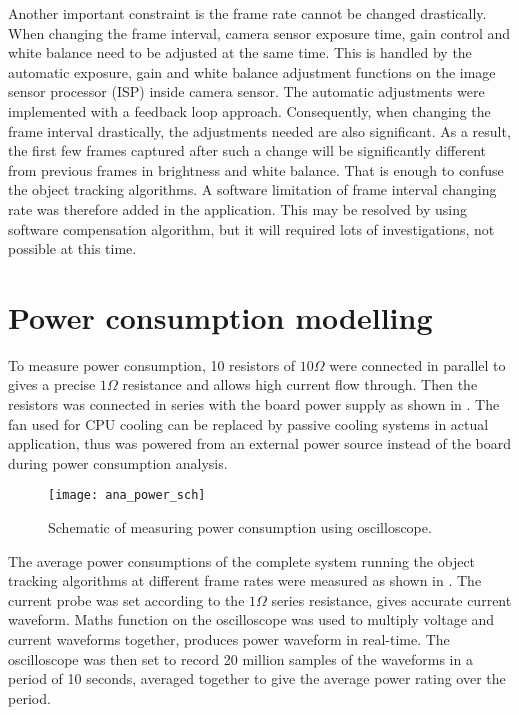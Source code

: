 Another important constraint is the frame rate cannot be changed drastically. When changing the frame interval, camera sensor exposure time, gain control and white balance need to be adjusted at the same time. This is handled by the automatic exposure, gain and white balance adjustment functions on the image sensor processor (ISP) inside camera sensor. The automatic adjustments were implemented with a feedback loop approach. Consequently, when changing the frame interval drastically, the adjustments needed are also significant. As a result, the first few frames captured after such a change will be significantly different from previous frames in brightness and white balance. That is enough to confuse the object tracking algorithms. A software limitation of frame interval changing rate was therefore added in the application. This may be resolved by using software compensation algorithm, but it will required lots of investigations, not possible at this time.



\section{}

\section{Power consumption modelling}

To measure power consumption, 10 resistors of $10 \Omega$ were connected in parallel to gives a precise $1 \Omega$ resistance and allows high current flow through. Then the resistors was connected in series with the board power supply as shown in . The fan used for CPU cooling can be replaced by passive cooling systems in actual application, thus was powered from an external power source instead of the board during power consumption analysis.

\begin{figure}[H]
  \centering
  \texttt{[image: ana\_power\_sch]}
  \caption{Schematic of measuring power consumption using oscilloscope.}
  \label{ana:power:sch}
\end{figure}

The average power consumptions of the complete system running the object tracking algorithms at different frame rates were measured as shown in . The current probe was set according to the $1 \Omega$ series resistance, gives accurate current waveform. Maths function on the oscilloscope was used to multiply voltage and current waveforms together, produces power waveform in real-time. The oscilloscope was then set to record 20 million samples of the waveforms in a period of 10 seconds, averaged together to give the average power rating over the period.

